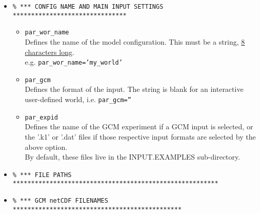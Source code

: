 \documentclass[11pt,fleqn]{book} %
\begin{document}
\begin{itemize}

\vspace{2mm}
\item []
\small\vspace{-2pt}\begin{verbatim}
% *** CONFIG NAME AND MAIN INPUT SETTINGS *******************************
\end{verbatim}\vspace{-2pt}\normalsize

\begin{itemize}[noitemsep]
\vspace{1mm}

\item [] \texttt{par\_wor\_name}
\\Defines the name of the model configuration. This must be a string, \uline{8 characters long}.
\\e.g. \texttt{par\_wor\_name='my\_world'}

\item [] \texttt{par\_gcm}
\\Defines the format of the input. The string is blank for an interactive user-defined world, i.e. \texttt{par\_gcm=''}


\item [] \texttt{par\_expid}
\\Defines the name of the GCM experiment if a GCM input is selected, or the '\textsf{\small .k1}' or '\textsf{\small .dat}' files if those respective input formats are selected by the above option.
\\By default, these files live in the \textsf{\small INPUT.EXAMPLES} sub-directory.

\end{itemize}

\vspace{2mm}
\item []
\small\vspace{-2pt}\begin{verbatim}
% *** FILE PATHS ********************************************************
\end{verbatim}\vspace{-2pt}\normalsize

\vspace{2mm}
\item []
\small\vspace{-2pt}\begin{verbatim}
% *** GCM netCDF FILENAMES **********************************************
\end{verbatim}\vspace{-2pt}\normalsize


\end{itemize}
\end{document}
